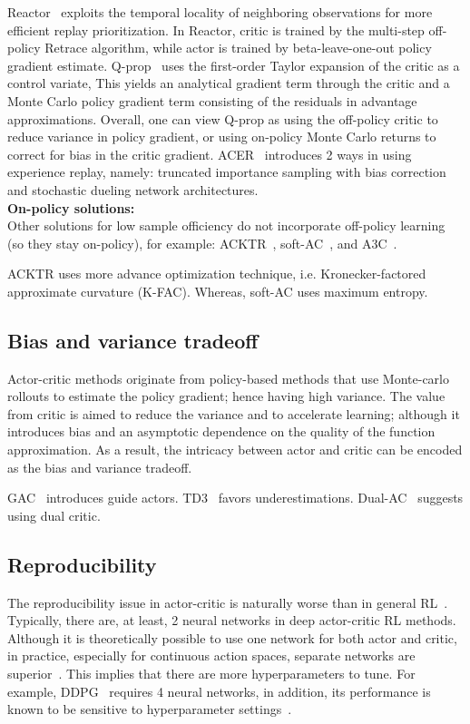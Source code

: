 Reactor~\cite{Gruslys2018} exploits the temporal locality of neighboring observations for
more efficient replay prioritization.
In Reactor, critic is trained by the multi-step off-policy Retrace algorithm,
while actor is trained by beta-leave-one-out policy gradient estimate.
Q-prop~\cite{} uses the first-order Taylor expansion of the critic as a control variate,
This yields an analytical gradient term through the critic and
a Monte Carlo policy gradient term consisting of the residuals in advantage approximations.
Overall, one can view Q-prop as
using the off-policy critic to reduce variance in policy gradient, or
using on-policy Monte Carlo returns to correct for bias in the critic gradient.
ACER~\cite{} introduces 2 ways in using experience replay, namely:
truncated importance sampling with bias correction and
stochastic dueling network architectures.\\

\noindent
\textbf{On-policy solutions:}\\
Other solutions for low sample officiency do not incorporate off-policy learning
(so they stay on-policy), for example: ACKTR~\cite{}, soft-AC~\cite{}, and A3C~\cite{}.

ACKTR uses more advance optimization technique, i.e. Kronecker-factored approximate curvature (K-FAC).
Whereas, soft-AC uses maximum entropy.

\subsection{Bias and variance tradeoff}
Actor-critic methods originate from policy-based methods that
use Monte-carlo rollouts to estimate the policy gradient; hence having high variance.
The value from critic is aimed to reduce the variance and to accelerate learning;
although it introduces bias and an asymptotic dependence on the quality of the function approximation.
As a result, the intricacy between actor and critic can be encoded as the bias and variance tradeoff.

GAC~\cite{} introduces guide actors.
TD3~\cite{} favors underestimations.
Dual-AC~\cite{} suggests using dual critic.

\subsection{Reproducibility}
The reproducibility issue in actor-critic is naturally worse than in general RL~\cite{}.
Typically, there are, at least, 2 neural networks in deep actor-critic RL methods.
Although it is theoretically possible to use one network for both actor and critic,
in practice, especially for continuous action spaces, separate networks are superior~\cite{A3c}.
This implies that there are more hyperparameters to tune.
For example, DDPG~\cite{} requires 4 neural networks, in addition,
its performance is known to be sensitive to hyperparameter settings~\cite{}.

